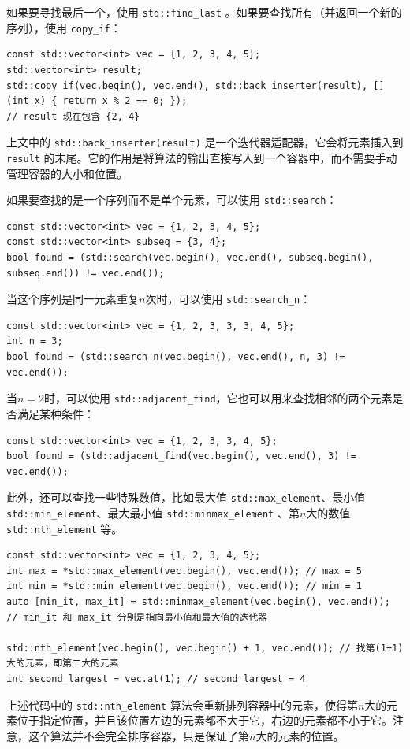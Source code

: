如果要寻找最后一个，使用 \verb|std::find_last| 。如果要查找所有（并返回一个新的序列），使用 \verb|copy_if|：
\begin{verbatim}
const std::vector<int> vec = {1, 2, 3, 4, 5};
std::vector<int> result;
std::copy_if(vec.begin(), vec.end(), std::back_inserter(result), [](int x) { return x % 2 == 0; });
// result 现在包含 {2, 4}
\end{verbatim}
上文中的 \verb|std::back_inserter(result)| 是一个迭代器适配器，它会将元素插入到 \verb|result| 的末尾。它的作用是将算法的输出直接写入到一个容器中，而不需要手动管理容器的大小和位置。

如果要查找的是一个序列而不是单个元素，可以使用 \verb|std::search|：
\begin{verbatim}
const std::vector<int> vec = {1, 2, 3, 4, 5};
const std::vector<int> subseq = {3, 4}; 
bool found = (std::search(vec.begin(), vec.end(), subseq.begin(), subseq.end()) != vec.end());
\end{verbatim}
当这个序列是同一元素重复$n$次时，可以使用 \verb|std::search_n|：
\begin{verbatim}
const std::vector<int> vec = {1, 2, 3, 3, 3, 4, 5};
int n = 3;
bool found = (std::search_n(vec.begin(), vec.end(), n, 3) != vec.end());
\end{verbatim}
当$n=2$时，可以使用 \verb|std::adjacent_find|，它也可以用来查找相邻的两个元素是否满足某种条件：
\begin{verbatim}
const std::vector<int> vec = {1, 2, 3, 3, 4, 5};
bool found = (std::adjacent_find(vec.begin(), vec.end(), 3) != vec.end());
\end{verbatim}

此外，还可以查找一些特殊数值，比如最大值 \verb|std::max_element|、最小值 \verb|std::min_element|、最大最小值 \verb|std::minmax_element| 、第$n$大的数值 \verb|std::nth_element| 等。
\begin{verbatim}
const std::vector<int> vec = {1, 2, 3, 4, 5};
int max = *std::max_element(vec.begin(), vec.end()); // max = 5
int min = *std::min_element(vec.begin(), vec.end()); // min = 1
auto [min_it, max_it] = std::minmax_element(vec.begin(), vec.end()); // min_it 和 max_it 分别是指向最小值和最大值的迭代器

std::nth_element(vec.begin(), vec.begin() + 1, vec.end()); // 找第(1+1)大的元素，即第二大的元素
int second_largest = vec.at(1); // second_largest = 4
\end{verbatim}
上述代码中的 \verb|std::nth_element| 算法会重新排列容器中的元素，使得第$n$大的元素位于指定位置，并且该位置左边的元素都不大于它，右边的元素都不小于它。注意，这个算法并不会完全排序容器，只是保证了第$n$大的元素的位置。

